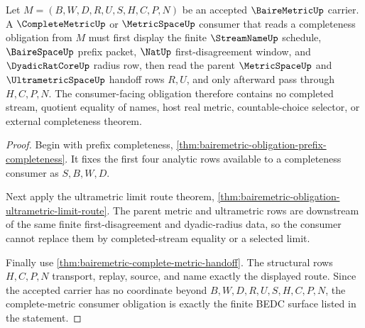 \begin{theorem}
\label{thm:bairemetric-obligation-complete-metric-consumer}
Let $M=(B,W,D,R,U,S,H,C,P,N)$ be an accepted $\BaireMetricUp$ carrier. A $\CompleteMetricUp$ or $\MetricSpaceUp$ consumer that reads a completeness obligation from $M$ must first display the finite $\StreamNameUp$ schedule, $\BaireSpaceUp$ prefix packet, $\NatUp$ first-disagreement window, and $\DyadicRatCoreUp$ radius row, then read the parent $\MetricSpaceUp$ and $\UltrametricSpaceUp$ handoff rows $R,U$, and only afterward pass through $H,C,P,N$. The consumer-facing obligation therefore contains no completed stream, quotient equality of names, host real metric, countable-choice selector, or external completeness theorem.
\end{theorem}
\begin{proof}
Begin with prefix completeness, \autoref{thm:bairemetric-obligation-prefix-completeness}. It fixes the first four analytic rows available to a completeness consumer as $S,B,W,D$.

Next apply the ultrametric limit route theorem, \autoref{thm:bairemetric-obligation-ultrametric-limit-route}. The parent metric and ultrametric rows are downstream of the same finite first-disagreement and dyadic-radius data, so the consumer cannot replace them by completed-stream equality or a selected limit.

Finally use \autoref{thm:bairemetric-complete-metric-handoff}. The structural rows $H,C,P,N$ transport, replay, source, and name exactly the displayed route. Since the accepted carrier has no coordinate beyond $B,W,D,R,U,S,H,C,P,N$, the complete-metric consumer obligation is exactly the finite BEDC surface listed in the statement.
\end{proof}

